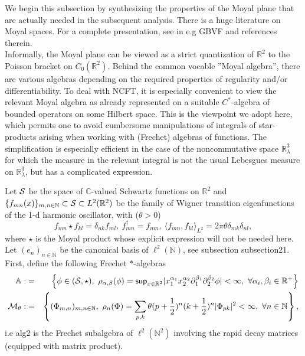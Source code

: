 \documentclass[10pt]{book}
\renewcommand{\sup}{\mathsf{sup}}
\theoremstyle{break}
\begin{document}

We begin this subsection by synthesizing the properties of the Moyal plane that are actually needed in the subsequent analysis. There is a huge literature on Moyal spaces. For a complete presentation, see in e.g {GBVF} and references therein.\\
Informally, the Moyal plane can be viewed as a strict quantization of $\mathbb{R}^2$ to the Poisson bracket on $C_0(\mathbb{R}^2)$. Behind the common vocable ''Moyal algebra'', there are various algebras depending on the required properties of regularity and/or differentiability. To deal with NCFT, it is especially convenient to view the relevant Moyal algebra as already represented on a suitable $C^*$-algebra of bounded operators on some Hilbert space. This is the viewpoint we adopt here, which permits one to avoid cumbersome manipulations of integrals of star-products arising when working with (Frechet) algebras of functions. The simplification is especially efficient in the case of the noncommutative space $\mathbb{R}^3_\lambda$ for which the measure in the relevant integral is not the usual Lebesgues measure on $\mathbb{R}^3_\lambda$, but has a complicated expression.\par

Let ${\cal{S}}$ be the space of $\mathbb{C}$-valued Schwartz functions on $\mathbb{R}^2$ and $\{f_{mn}(x) \}_{m,n\in\mathbb{N}}\subset{\cal{S}}\subset L^2(\mathbb{R}^2)$ be the family of Wigner transition eigenfunctions of the 1-d harmonic oscillator, with ($\theta>0$)
\begin{equation*}
f_{mn}\star f_{kl}=\delta_{nk}f_{ml},\ f_{mn}^\dag=f_{nm},\ \langle f_{mn},f_{kl} \rangle_{L^2}=2\pi\theta\delta_{mk}\delta_{nl},
\end{equation*}
where $\star$ is the Moyal product whose explicit expression will not be needed here. Let $(e_n)_{n\in\mathbb{N}}$ be the canonical basis of $\ell^2(\mathbb{N})$, see subsection {subsection21}. First, define the following Frechet $*$-algebras
\begin{eqnarray*}
{\mathbb{A}}:&=&\left\{\phi\in({\cal{S}},\star),\ \rho_{\alpha,\beta}(\phi)=\sup_{x\in\mathbb{R}^2}|x_1^{\alpha_1}x_2^{\alpha_2}\partial_1^{\beta_1}\partial_2^{\beta_2}\phi|<\infty,\ \forall \alpha_i,\beta_i\in\mathbb{R}^+ \right\}\\
{\cal{M}}_\theta:&=&\left\{(\Phi_{m,n})_{m,n\in\mathbb{N}},\ \rho_n(\Phi)=\sum_{p,k}\theta(p+\frac{1}{2})^n(k+\frac{1}{2})^n|\Phi_{pk}|^2<\infty,\ \forall n\in\mathbb{N}\right\},
\end{eqnarray*}
i.e alg2 is the Frechet subalgebra of $\ell^2(\mathbb{N}^2)$ involving the rapid decay matrices (equipped with matrix product).
\end{document}
